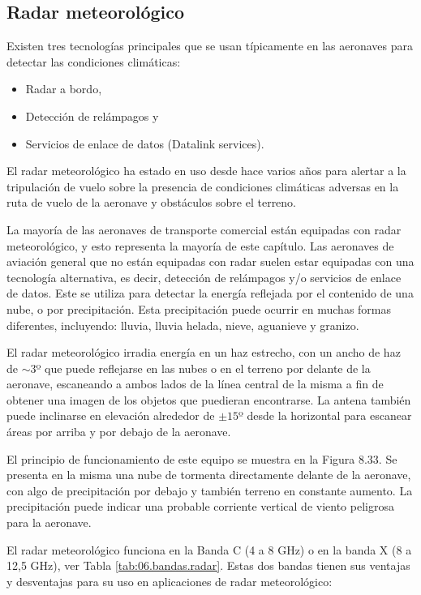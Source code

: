  \subsection{Radar meteorol\'ogico}
 \label{sec:U06.06.radar.metereologico}

 Existen tres tecnologías principales que se usan típicamente en las aeronaves para detectar las condiciones climáticas:

\begin{itemize}
     \item Radar a bordo,
     \item Detección de rel\'ampagos y
     \item Servicios de enlace de datos (Datalink services).
\end{itemize}

 El radar meteorológico ha estado en uso desde hace varios años para alertar a la tripulación de vuelo sobre la presencia de condiciones climáticas adversas en la ruta de vuelo de la aeronave y obst\'aculos sobre el terreno. 

 La mayoría de las aeronaves de transporte comercial están equipadas con radar meteorológico, y esto representa la mayoría de este capítulo. Las aeronaves de aviación general que no están equipadas con radar suelen estar equipadas con una tecnología alternativa, es decir, detección de rel\'ampagos y/o servicios de enlace de datos.
 Este se utiliza para  detectar la energía reflejada por el contenido de una nube, o por precipitación. Esta precipitación puede ocurrir en muchas formas diferentes, incluyendo: lluvia, lluvia helada, nieve, aguanieve y granizo. 

 El radar meteorológico irradia energía en un haz estrecho, con un ancho de haz de $\sim 3$º que puede reflejarse en las nubes o en el terreno por delante de la aeronave, escaneando a ambos lados de la línea central de la misma a fin de obtener  una imagen de los objetos que puedieran encontrarse. La antena también puede inclinarse en elevación alrededor de $\pm 15$º desde la horizontal para escanear áreas por arriba y por debajo de la aeronave.

El principio de funcionamiento de este equipo se muestra en la 
Figura 8.33. Se presenta en la misma una nube de tormenta directamente delante de la aeronave, con algo de precipitación por debajo y también terreno en constante aumento. La precipitación puede indicar  una probable corriente vertical de viento peligrosa para la aeronave.

 El radar meteorológico funciona en la Banda C (4 a 8 GHz) o en la banda X (8 a 12,5 GHz), 
ver Tabla \ref{tab:06.bandas.radar}. 
Estas dos bandas tienen sus ventajas y desventajas para su uso en aplicaciones de radar meteorológico:


